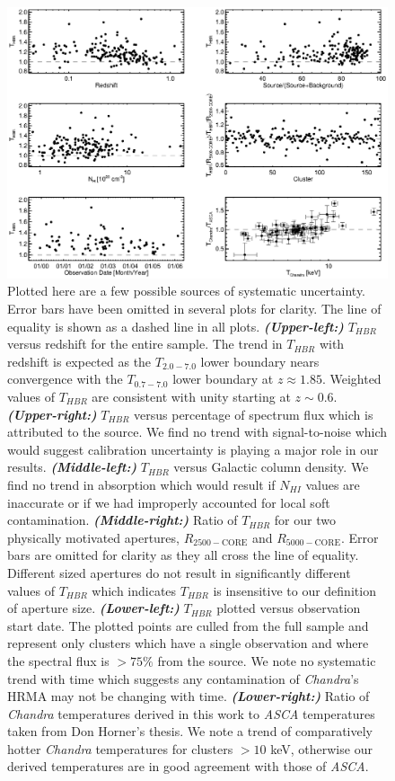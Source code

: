 \documentclass[12pt,preprint]{aastex}
\begin{document}
\clearpage
\begin{figure}
\begin{center}
\includegraphics*[width=\textwidth, trim=0mm 0mm 0mm 0mm, clip]{f4.eps}
\caption{
Plotted here are a few possible sources of systematic uncertainty.
Error bars have been omitted in several plots for clarity. The line of
equality is shown as a dashed line in all
plots. {\bfseries\em{(Upper-left:)}} $T_{HBR}$ versus redshift for the
entire sample. The trend in $T_{HBR}$ with redshift is expected as the
$T_{2.0-7.0}$ lower boundary nears convergence with the $T_{0.7-7.0}$
lower boundary at $z \approx 1.85$. Weighted values of $T_{HBR}$ are
consistent with unity starting at $z \sim
0.6$. {\bfseries\em{(Upper-right:)}} $T_{HBR}$ versus percentage of
spectrum flux which is attributed to the source. We find no trend with
signal-to-noise which would suggest calibration uncertainty is playing
a major role in our results. {\bfseries\em{(Middle-left:)}} $T_{HBR}$
versus Galactic column density. We find no trend in absorption which
would result if $N_{HI}$ values are inaccurate or if we had improperly
accounted for local soft
contamination. {\bfseries\em{(Middle-right:)}} Ratio of $T_{HBR}$ for
our two physically motivated apertures, $R_{2500-\mathrm{CORE}}$ and
$R_{5000-\mathrm{CORE}}$. Error bars are omitted for clarity as they all
cross the line of equality. Different sized apertures do not result in
significantly different values of $T_{HBR}$ which indicates $T_{HBR}$
is insensitive to our definition of aperture
size. {\bfseries\em{(Lower-left:)}} $T_{HBR}$ plotted versus
observation start date. The plotted points are culled from the full
sample and represent only clusters which have a single observation and
where the spectral flux is $> 75\%$ from the source. We note no
systematic trend with time which suggests any contamination of {\it
Chandra}'s HRMA may not be changing with
time. {\bfseries\em{(Lower-right:)}} Ratio of {\it Chandra}
temperatures derived in this work to {\it ASCA} temperatures taken
from Don Horner's thesis. We note a trend of comparatively hotter {\it
Chandra} temperatures for clusters $> 10$ keV, otherwise our derived
temperatures are in good agreement with those of {\it ASCA}.
}
\label{fig:sys}
\end{center}
\end{figure}
\clearpage
\end{document}
